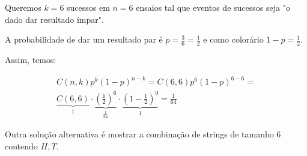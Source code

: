 \item
Queremos $k=6$ sucessos em $n=6$ ensaios tal que eventos de sucessos seja "o dado dar resultado ímpar".

A probabilidade de dar um resultado par é $p=\frac{3}{6}=\frac{1}{2}$ e como
colorário $1-p=\frac{1}{2}$.

Assim, temos:

\[\begin{array}{l}
C(n,k){p^k}{(1 - p)^{n - k}} = C(6,6){p^6}{(1 - p)^{6 - 6}} = \\
\underbrace {C(6,6)}_1 \cdot \underbrace {{{\left( {\frac{1}{2}} \right)}^6}}_{\frac{1}{{64}}} \cdot \underbrace {{{\left( {1 - \frac{1}{2}} \right)}^0}}_1 = \frac{1}{{64}}
\end{array}\]

Outra solução alternativa é mostrar a combinação de strings de tamanho 6 contendo ${H, T}$.
